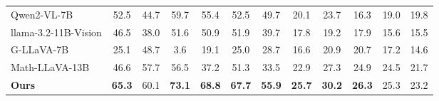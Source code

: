 \begin{table*}[htbp]
{\begin{tabular}{l||c|c|c|c|c|c||c|c|c|c|c}
    Qwen2-VL-7B & 52.5  & 44.7  & 59.7  & 55.4  & 52.5  & 49.7  & 20.1  & 23.7  & 16.3  & 19.0  & 19.8 \\
    llama-3.2-11B-Vision & 46.5  & 38.0  & 51.6  & 50.9  & 51.9  & 39.7  & 17.8  & 19.2  & 17.9  & 15.6  & 15.5 \\
    G-LLaVA-7B & 25.1  & 48.7  & 3.6   & 19.1  & 25.0  & 28.7  & 16.6  & 20.9  & 20.7  & 17.2  & 14.6 \\
    Math-LLaVA-13B & 46.6  & 57.7  & 56.5  & 37.2  & 51.3  & 33.5  & 22.9  & 27.3  & 24.9  & 24.5  & 21.7 \\
    \midrule
    \textbf{Ours} & \textbf{65.3} & 60.1  & \textbf{73.1} & \textbf{68.8} & \textbf{67.7} & \textbf{55.9} & \textbf{25.7} & \textbf{30.2} & \textbf{26.3} & 25.3  & 23.2 \\
    \bottomrule
    \end{tabular}%
    }
  \label{tab:main_exp}%
  \vspace{-2mm}
\end{table*}%
